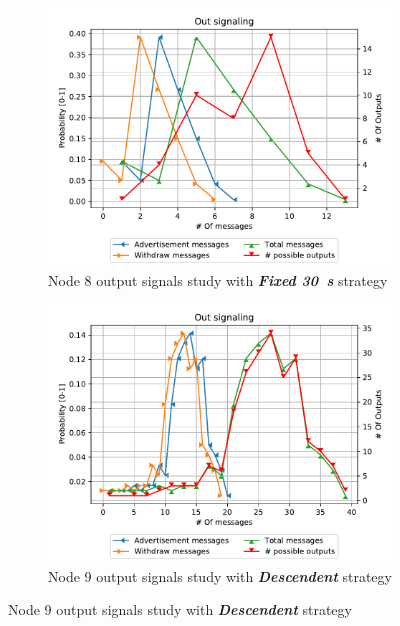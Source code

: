 \begin{figure}[ht]
     \centering
     \begin{subfigure}[b]{0.32\textwidth}
         \centering
         \includegraphics[width=\textwidth]{images/signal_study/fabrikant/30Fixed.pdf}
		 \caption{Node \num{8} output signals study with \textbf{\textit{Fixed \SI{30}{\second}}} strategy}
         \label{fig:signal_node9_fabrikant_fixed30_noIW}
     \end{subfigure}
     \hfill
     \begin{subfigure}[b]{0.32\textwidth}
         \centering
         \includegraphics[width=\textwidth]{images/signal_study/fabrikant/Descendent.pdf}
		 \caption{Node \num{9} output signals study with \textbf{\textit{Descendent}} strategy}

\end{subfigure}
\end{figure}
